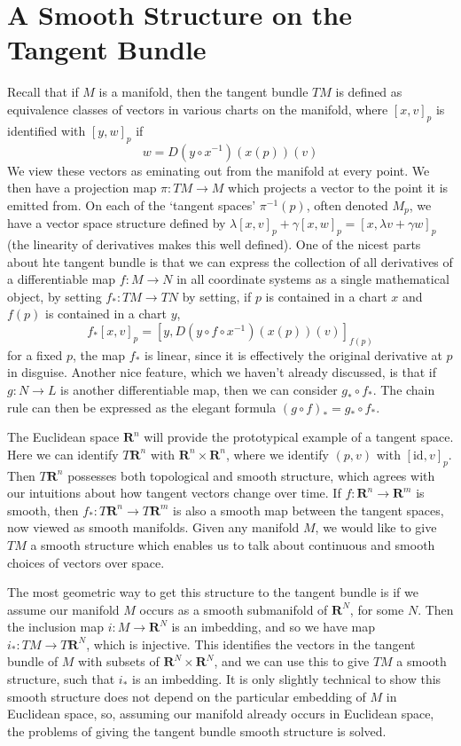 \section{A Smooth Structure on the Tangent Bundle}

Recall that if $M$ is a manifold, then the tangent bundle $TM$ is defined as equivalence classes of vectors in various charts on the manifold, where $[x,v]_p$ is identified with $[y,w]_p$ if
%
\[ w = D(y \circ x^{-1})(x(p))(v) \]
%
We view these vectors as eminating out from the manifold at every point. We then have a projection map $\pi: TM \to M$ which projects a vector to the point it is emitted from. On each of the `tangent spaces' $\pi^{-1}(p)$, often denoted $M_p$, we have a vector space structure defined by $\lambda [x,v]_p + \gamma [x,w]_p = [x,\lambda v + \gamma w]_p$ (the linearity of derivatives makes this well defined). One of the nicest parts about hte tangent bundle is that we can express the collection of all derivatives of a differentiable map $f: M \to N$ in all coordinate systems as a single mathematical object, by setting $f_*: TM \to TN$ by setting, if $p$ is contained in a chart $x$ and $f(p)$ is contained in a chart $y$,
%
\[ f_*[x,v]_p = \left[ y, D(y \circ f \circ x^{-1})(x(p))(v) \right]_{f(p)} \]
%
for a fixed $p$, the map $f_*$ is linear, since it is effectively the original derivative at $p$ in disguise. Another nice feature, which we haven't already discussed, is that if $g: N \to L$ is another differentiable map, then we can consider $g_* \circ f_*$. The chain rule can then be expressed as the elegant formula $(g \circ f)_* = g_* \circ f_*$.

The Euclidean space $\mathbf{R}^n$ will provide the prototypical example of a tangent space. Here we can identify $T\mathbf{R}^n$ with $\mathbf{R}^n \times \mathbf{R}^n$, where we identify $(p,v)$ with $[\text{id}, v]_p$. Then $T\mathbf{R}^n$ possesses both topological and smooth structure, which agrees with our intuitions about how tangent vectors change over time. If $f: \mathbf{R}^n \to \mathbf{R}^m$ is smooth, then $f_*: T\mathbf{R}^n \to T\mathbf{R}^m$ is also a smooth map between the tangent spaces, now viewed as smooth manifolds. Given any manifold $M$, we would like to give $TM$ a smooth structure which enables us to talk about continuous and smooth choices of vectors over space.

The most geometric way to get this structure to the tangent bundle is if we assume our manifold $M$ occurs as a smooth submanifold of $\mathbf{R}^N$, for some $N$. Then the inclusion map $i: M \to \mathbf{R}^N$ is an imbedding, and so we have map $i_*: TM \to T\mathbf{R}^N$, which is injective. This identifies the vectors in the tangent bundle of $M$ with subsets of $\mathbf{R}^N \times \mathbf{R}^N$, and we can use this to give $TM$ a smooth structure, such that $i_*$ is an imbedding. It is only slightly technical to show this smooth structure does not depend on the particular embedding of $M$ in Euclidean space, so, assuming our manifold already occurs in Euclidean space, the problems of giving the tangent bundle smooth structure is solved.

